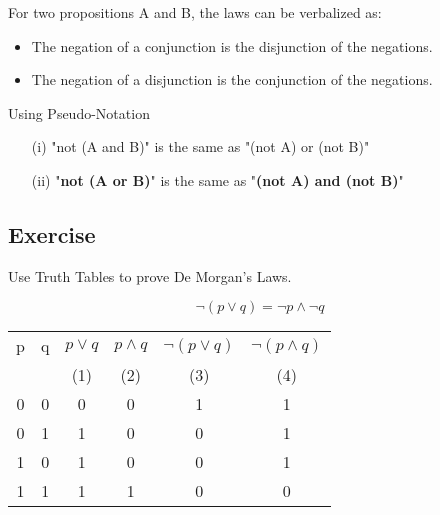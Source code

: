 \noindent For two propositions A and B, the laws can be verbalized as:
\begin{itemize}
\item The negation of a conjunction is the disjunction of the negations.
\item The negation of a disjunction is the conjunction of the negations.
\end{itemize}

\begin{framed}
\noindent Using Pseudo-Notation
\begin{itemize}
	\item[(i)]"not (A and B)" is the same as "(not A) or (not B)"
	
	\item[(ii)] "\textbf{not (A or B)}" is the same as "\textbf{(not A) and (not B)}"
\end{itemize}
\end{framed}
\newpage

\subsection{Exercise }Use Truth Tables to prove De Morgan's Laws.
{
	\LARGE
\[  \neg (p \vee q) = \neg p \wedge \neg q\]

}
{
	
\Large
\begin{center}
\begin{tabular}{|c|c||c|c|c|c|}
  \hline
p	&	q	&	$ p \vee q$	&	$ p \wedge q$&	$\neg (p \vee q)$	&	$\neg (p \wedge q)$\\
	&		&	(1)	&	(2)	&	(3)	&	(4)	\\ \hline
\phantom{sp}0\phantom{sp}	&	\phantom{sp}0\phantom{sp}	&	\phantom{sp}0\phantom{sp}	&	\phantom{sp}0\phantom{sp}	&	1	&	1 \\
0	&	1	&	1	&	0	&	0	&	1\\
1	&	0	&	1	&	0	&	0	&	1\\
1	&	1	&	1	&	1	&	\phantom{sp}0\phantom{sp}	&	\phantom{sp}0\phantom{sp}\\
  \hline
\end{tabular}
\end{center}
}
\newpage

